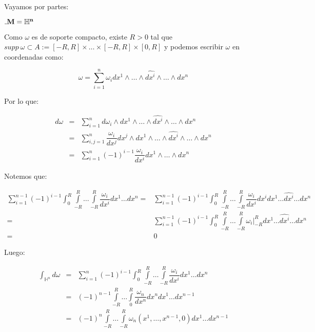 \documentclass[11pt]{article}
\numberwithin{theorem}{subsection}
\newenvironment{proof}[1][Demostraci\'on]{\begin{trivlist}
		\item[\hskip \labelsep {\bfseries #1}]}{\end{trivlist}}
\begin{document}
\begin{proof}
	Vayamos por partes:
	\medskip
	
	$\mathunderscore{\mathbf{M = \mathbb{H}^n}}$
	
	\medskip
	
	Como $\omega$ es de soporte compacto, existe $R >0$ tal que $supp \ \omega \subset A := [-R,R] \times \dots \times [-R,R] \times [0,R] $ y podemos escribir $\omega$ en coordenadas como:
	
	
	\begin{equation*}
	\omega = \sum\limits_{i =1 }^{n} {\omega_i dx^1 \wedge \dots \wedge \widehat{dx^i} \wedge \dots \wedge dx^n}
	\end{equation*}
	
	
	Por lo que:
	
	\begin{equation*}
		\begin{aligned}
			d\omega & = & \sum\limits_{i =1 }^{n} {d\omega_i \wedge dx^1 \wedge \dots \wedge \widehat{dx^i} \wedge \dots \wedge dx^n} \\
			& = & \sum\limits_{i,j =1 }^{n} {\dfrac{\omega_i}{dx^j} dx^j \wedge dx^1 \wedge \dots \wedge \widehat{dx^i} \wedge \dots \wedge dx^n} \\
			& = & \sum\limits_{i =1 }^{n} {(-1)^{i-1}\dfrac{\omega_i}{dx^i}  dx^1 \wedge \dots \wedge dx^n} 
		\end{aligned}
	\end{equation*}
	
		Notemos que:
	
	\begin{equation*}
	\begin{aligned}
	\sum\limits_{i =1 }^{n-1} {(-1)^{i-1} \int_{0}^{R} \int\limits_{-R}^{R} \dots \int\limits_{-R}^{R} \dfrac{\omega_i}{dx^i}  dx^1 \dots dx^n} = & \sum\limits_{i =1 }^{n-1} {(-1)^{i-1} \int_{0}^{R} \int\limits_{-R}^{R} \dots \int\limits_{-R}^{R} \dfrac{\omega_i}{dx^i}  dx^i dx^1 \dots \widehat{dx^i} \dots dx^n} \\
	= &  \sum\limits_{i =1 }^{n-1} {(-1)^{i-1} \int_{0}^{R} \int\limits_{-R}^{R} \dots \int\limits_{-R}^{R} \omega_i \vert_{-R}^{R} dx^1 \dots \widehat{dx^i} \dots dx^n} \\
	= & 0
	\end{aligned}
	\end{equation*}
	
	Luego:
	
	\begin{equation*}
	\begin{aligned}
		\int_{\mathbb{H}^n} {d \omega} & = & \sum\limits_{i =1 }^{n} {(-1)^{i-1} \int_{0}^{R} \int\limits_{-R}^{R} \dots \int\limits_{-R}^{R} \dfrac{\omega_i}{dx^i}  dx^1 \dots dx^n} \\
		& = & (-1)^{n-1}  \int\limits_{-R}^{R} \dots \int\limits_{0}^{R} \dfrac{\omega_n}{dx^n} dx^n  dx^1 \dots dx^{n-1} \\
		& = & (-1)^{n}  \int\limits_{-R}^{R} \dots \int\limits_{-R}^{R} \omega_n(x^1, \dots, x^{n-1},0) dx^1 \dots dx^{n-1}
	\end{aligned}
	\end{equation*}
	

\end{proof}
\end{document}
